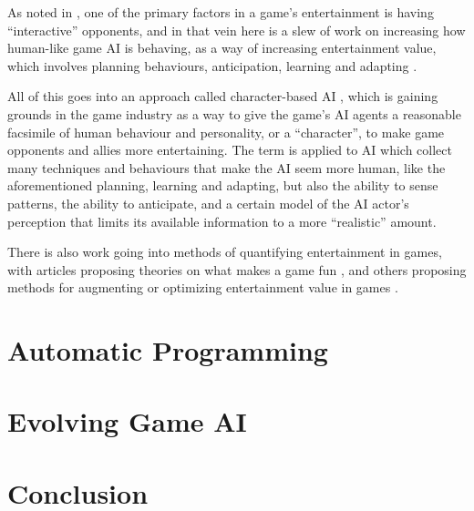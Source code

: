 \documentclass[]{report}
\begin{document}
As noted in \citet{yannakakis2004interactive}, one of the primary factors in a
game's entertainment is having ``interactive'' opponents, and in that vein here
is a slew of work on increasing how human-like game AI is behaving, as a way of
increasing entertainment value, which involves planning behaviours,
anticipation, learning and adapting
\citep{orkin2004symbolic,orkin2003applying,
yannakakis2009real,spronck2005adaptive}.

All of this goes into an approach called character-based AI
\citep[][]{isla2002new}, which is gaining grounds in the game industry as a way
to give the game's AI agents a reasonable facsimile of human behaviour and
personality, or a ``character'', to make game opponents and allies more
entertaining. The term is applied to AI which collect many techniques and
behaviours that make the AI seem more human, like the aforementioned planning,
learning and adapting, but also the ability to sense patterns, the ability to
anticipate, and a certain model of the AI actor's perception that limits its
available information to a more ``realistic'' amount.

There is also work going into methods of quantifying entertainment in games,
with articles proposing theories on what makes a game fun
\citep[e.g.][]{malone1981makes,read2002endurability,
lazzaro2004we,koster2004theory}, and others proposing methods for augmenting
or optimizing entertainment value in games
\citep[e.g.][]{yannakakis2009real,yannakakis2008model,yannakakis2007towards}.

\chapter{Automatic Programming}
\label{cha:autom-progr}

\chapter{Evolving Game AI}
\label{cha:game-ai-via}

\chapter{Conclusion}
\label{cha:conclusion}



\end{document}

